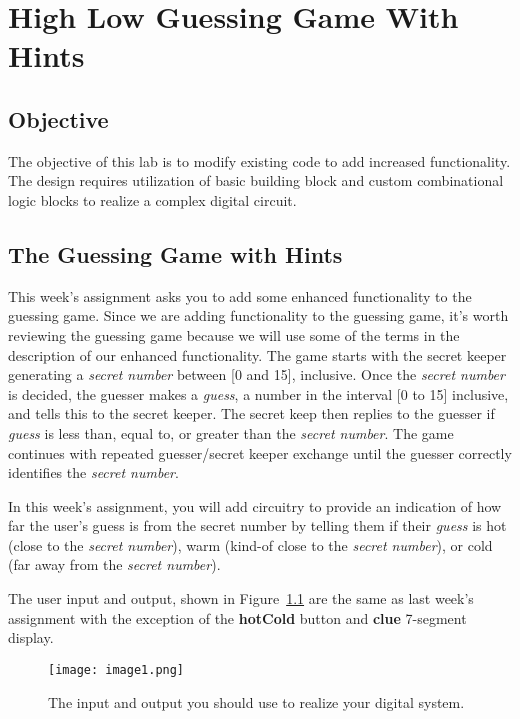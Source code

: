 \chapter{High Low Guessing Game With Hints}
\label{chapter:hlggwh}
\graphicspath{ {./Lab05HighLowWithHints/Fig} }

\hypertarget{objective}{%
\section{\texorpdfstring{Objective }{Objective }}
\label{section:objectiveHighLowGuessHints}}

The objective of this lab is to modify existing code to add increased
functionality. The design requires utilization of basic building block
and custom combinational logic blocks to realize a complex digital
circuit.

\section{The Guessing Game with Hints}

This week's assignment asks you to add some enhanced functionality to
the guessing game. Since we are adding functionality to the guessing
game, it's worth reviewing the guessing game because we will use some of
the terms in the description of our enhanced functionality. The game
starts with the secret keeper generating a \emph{secret number} between
{[}0 and 15{]}, inclusive. Once the \emph{secret number} is decided, the
guesser makes a \emph{guess}, a number in the interval {[}0 to 15{]}
inclusive, and tells this to the secret keeper. The secret keep then
replies to the guesser if \emph{guess} is less than, equal to, or
greater than the \emph{secret number}. The game continues with repeated
guesser/secret keeper exchange until the guesser correctly identifies
the \emph{secret number}.

In this week's assignment, you will add circuitry to provide an
indication of how far the user's guess is from the secret number by
telling them if their \emph{guess} is hot (close to the \emph{secret
number}), warm (kind-of close to the \emph{secret number}), or cold (far
away from the \emph{secret number}).

The user input and output, shown in Figure~\ref{fig:iOonDevBorad} are the same as last week's
assignment with the exception of the \textbf{hotCold} button and
\textbf{clue} 7-segment display.

\begin{figure}
\texttt{[image:  image1.png]}
\caption{The input and output you should use to realize your digital system.}
\label{fig:iOonDevBorad}
\end{figure}

